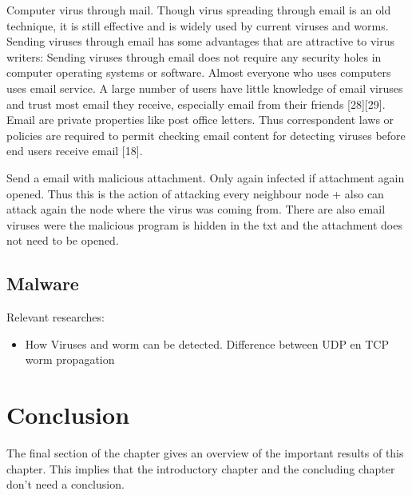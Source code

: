 Computer virus through mail. 
Though virus spreading through email is an old technique, it is still effective and is widely used by
current viruses and worms. Sending viruses through email has some advantages that are attractive to
virus writers:
 Sending viruses through email does not require any security holes in computer operating systems
or software.
 Almost everyone who uses computers uses email service.
 A large number of users have little knowledge of email viruses and trust most email they receive,
especially email from their friends [28][29].
 Email are private properties like post office letters. Thus correspondent laws or policies are required
to permit checking email content for detecting viruses before end users receive email [18].

Send a email with malicious attachment. Only again infected if attachment again opened. Thus this is the action of attacking every neighbour node + also can attack again the node where the virus was coming from.
There are also email viruses were the malicious program is hidden in the txt and the attachment does not need to be opened. 




\subsection{Malware}
Relevant researches:
\begin{itemize}
\item How Viruses and worm can be detected. Difference between UDP en TCP worm propagation
\end{itemize}




\section{Conclusion}
\label{Cha:1:Conclusion}
The final section of the chapter gives an overview of the important results
of this chapter. This implies that the introductory chapter and the
concluding chapter don't need a conclusion.



%
